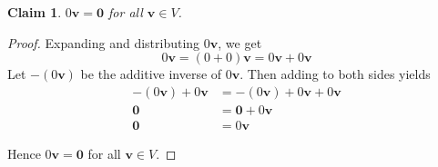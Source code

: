\documentclass{article}
\newtheorem*{claim}{Claim}
\begin{document}
\begin{claim}
    $0\mathbf{v} = \mathbf{0}$ for all $\mathbf{v} \in V$.
\end{claim}

\begin{proof}
    Expanding and distributing $0\mathbf{v}$, we get
    \[
    0\mathbf{v} = (0 + 0)\mathbf{v} = 0\mathbf{v} + 0\mathbf{v}
    \]
    Let $-(0\mathbf{v})$ be the additive inverse of $0\mathbf{v}$. Then adding to both sides yields
    \[
    \begin{aligned}
        -(0\mathbf{v}) + 0\mathbf{v} &= -(0\mathbf{v}) + 0\mathbf{v} + 0\mathbf{v} \\
        \mathbf{0} &= \mathbf{0} + 0\mathbf{v} \\
        \mathbf{0} &= 0\mathbf{v}
    \end{aligned}
    \]

    \medskip

    Hence $0\mathbf{v} = \mathbf{0}$ for all $\mathbf{v} \in V$.
\end{proof}
\end{document}
